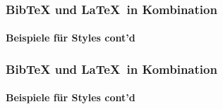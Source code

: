 \begin{frame}
\frametitle{BibTeX und \LaTeX ~in Kombination}
\framesubtitle{Beispiele für Styles cont'd}
\end{frame}


\begin{frame}
\frametitle{BibTeX und \LaTeX ~in Kombination}
\framesubtitle{Beispiele für Styles cont'd}
\end{frame}